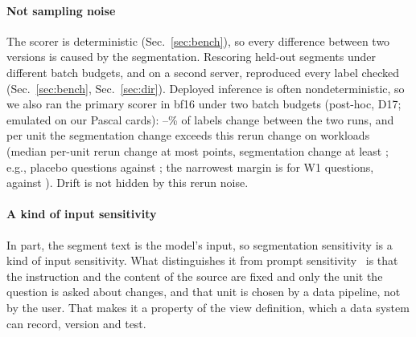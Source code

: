 \documentclass[conference]{IEEEtran}
\begin{document}
\paragraph*{Not sampling noise} The scorer is deterministic (Sec.~\ref{sec:bench}), so every difference between two
versions is caused by the segmentation. Rescoring held-out segments under different batch budgets, and on a second
server, reproduced every label checked (Sec.~\ref{sec:bench}, Sec.~\ref{sec:dir}). Deployed inference is often
nondeterministic, so we also ran the primary scorer in bf16 under two batch budgets (post-hoc, D17; emulated on our
Pascal cards): \nBfFlipMin--\nBfFlipMax\% of labels change between the two runs, and per unit the segmentation change
exceeds this rerun change on \nBfAll{} workloads (median per-unit rerun change at most \nBfRerunMax{} points, segmentation
change at least \nBfSegMin; e.g., placebo questions \nBfWtwoQuSeg{} against \nBfWtwoQuRerun; the narrowest margin is for W1 questions, \nBfWoneQuSeg{} against \nBfWoneQuRerun). Drift
is not hidden by this rerun noise.
\paragraph*{A kind of input sensitivity} In part, the segment text is the model's input, so segmentation
sensitivity is a kind of input sensitivity. What distinguishes it from prompt sensitivity~\cite{sclar} is that the
instruction and the content of the source are fixed and only the unit the question is asked about changes, and that
unit is chosen by a data pipeline, not by the user. That makes it a property of the view definition, which a data
system can record, version and test.
\end{document}
